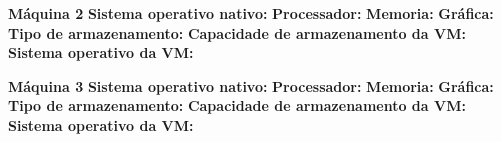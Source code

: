 \textbf{Máquina 2}
\textbf{Sistema operativo nativo:} \textit{}
\textbf{Processador:} \textit{}
\textbf{Memoria:} \textit{}
\textbf{Gráfica:} \textit{}
\textbf{Tipo de armazenamento:} \textit{}
\textbf{Capacidade de armazenamento da VM:} \textit{}
\textbf{Sistema operativo da VM:} \textit{}

\textbf{Máquina 3}
\textbf{Sistema operativo nativo:} \textit{}
\textbf{Processador:} \textit{}
\textbf{Memoria:} \textit{}
\textbf{Gráfica:} \textit{}
\textbf{Tipo de armazenamento:} \textit{}
\textbf{Capacidade de armazenamento da VM:} \textit{}
\textbf{Sistema operativo da VM:} \textit{}
